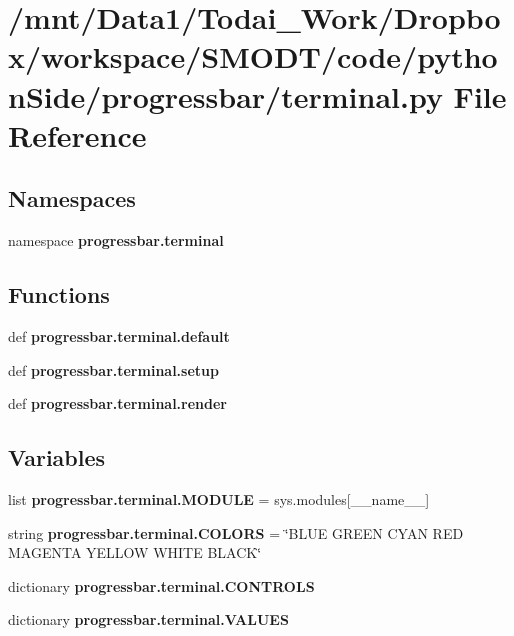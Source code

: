 \section{/mnt/\-Data1/\-Todai\-\_\-\-Work/\-Dropbox/workspace/\-S\-M\-O\-D\-T/code/python\-Side/progressbar/terminal.py File Reference}
\label{terminal_8py}
\subsection*{Namespaces}
\begin{DoxyCompactItemize}
\item 
namespace {\bf progressbar.\-terminal}
\end{DoxyCompactItemize}
\subsection*{Functions}
\begin{DoxyCompactItemize}
\item 
def {\bf progressbar.\-terminal.\-default}
\item 
def {\bf progressbar.\-terminal.\-setup}
\item 
def {\bf progressbar.\-terminal.\-render}
\end{DoxyCompactItemize}
\subsection*{Variables}
\begin{DoxyCompactItemize}
\item 
list {\bf progressbar.\-terminal.\-M\-O\-D\-U\-L\-E} = sys.\-modules[\-\_\-\-\_\-name\-\_\-\-\_\-]
\item 
string {\bf progressbar.\-terminal.\-C\-O\-L\-O\-R\-S} = \char`\"{}B\-L\-U\-E G\-R\-E\-E\-N C\-Y\-A\-N R\-E\-D M\-A\-G\-E\-N\-T\-A Y\-E\-L\-L\-O\-W W\-H\-I\-T\-E B\-L\-A\-C\-K\char`\"{}
\item 
dictionary {\bf progressbar.\-terminal.\-C\-O\-N\-T\-R\-O\-L\-S}
\item 
dictionary {\bf progressbar.\-terminal.\-V\-A\-L\-U\-E\-S}
\end{DoxyCompactItemize}
